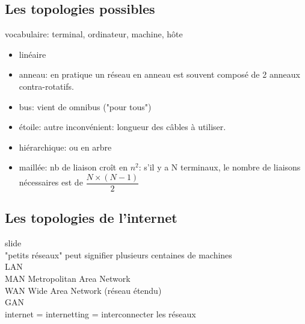 \documentclass[a4paper,11pt]{article}
\begin{document}
\begin{Form}
\subsection{Les topologies possibles}
\begin{commentprof}
vocabulaire: terminal, ordinateur, machine, hôte
\end{commentprof}
\begin{itemize}
\item linéaire
\item anneau: en pratique un réseau en anneau est souvent composé de 2 anneaux contra-rotatifs.
\item bus: vient de omnibus ("pour tous")
\item étoile: autre inconvénient: longueur des câbles à utiliser.
\item hiérarchique: ou en arbre 
\item maillée: nb de liaison croît en $n^2$: s'il y a N terminaux, le nombre de liaisons nécessaires est de $\dfrac{N×(N-1)}{2}$
\end{itemize}
\subsection{Les topologies de l'internet}
\begin{commentprof}
slide\\
"petits réseaux" peut signifier plusieurs centaines de machines\\
LAN\\
MAN Metropolitan Area Network\\
WAN Wide Area Network (réseau étendu)\\
GAN\\
internet = internetting = interconnecter les réseaux
\end{commentprof}
\end{Form}
\end{document}
